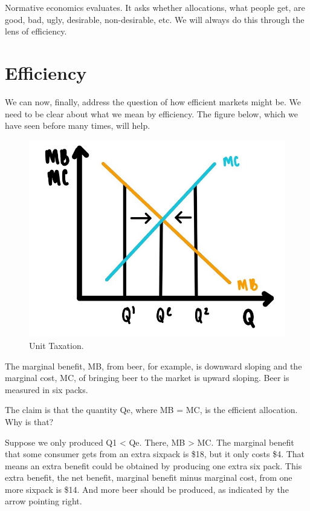 \documentclass[
]{book}
\begin{document}
Normative economics evaluates. It asks whether allocations, what people get, are good, bad, ugly, desirable, non-desirable, etc. We will always do this through the lens of efficiency.

\hypertarget{efficiency}{%
\section{Efficiency}\label{efficiency}}

We can now, finally, address the question of how efficient markets might be. We need to be clear about what we mean by efficiency. The figure below, which we have seen before many times, will help.

\begin{figure}

{\centering \includegraphics[width=1\linewidth]{img/ch5/fig11} 

}

\caption{Unit Taxation.}\label{fig:fig511}
\end{figure}

The marginal benefit, MB, from beer, for example, is downward sloping and the marginal cost, MC, of bringing beer to the market is upward sloping. Beer is measured in six packs.

The claim is that the quantity Qe, where MB = MC, is the efficient allocation. Why is that?

Suppose we only produced Q1 \textless{} Qe. There, MB \textgreater{} MC. The marginal benefit that some consumer gets from an extra sixpack is \$18, but it only costs \$4. That means an extra benefit could be obtained by producing one extra six pack. This extra benefit, the net benefit, marginal benefit minus marginal cost, from one more sixpack is \$14. And more beer should be produced, as indicated by the arrow pointing right.
\end{document}

